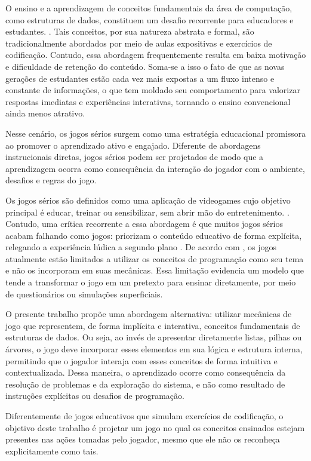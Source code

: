 O ensino e a aprendizagem de conceitos fundamentais da área de computação, como estruturas de dados, constituem um desafio recorrente para educadores e estudantes. . Tais conceitos, por sua natureza abstrata e formal, são tradicionalmente abordados por meio de aulas expositivas e exercícios de codificação. Contudo, essa abordagem frequentemente resulta em baixa motivação e dificuldade de retenção do conteúdo. Soma-se a isso o fato de que as novas gerações de estudantes estão cada vez mais expostas a um fluxo intenso e constante de informações, o que tem moldado seu comportamento para valorizar respostas imediatas e experiências interativas, tornando o ensino convencional ainda menos atrativo.

Nesse cenário, os jogos sérios surgem como uma estratégia educacional promissora ao promover o aprendizado ativo e engajado. Diferente de abordagens instrucionais diretas, jogos sérios podem ser projetados de modo que a aprendizagem ocorra como consequência da interação do jogador com o ambiente, desafios e regras do jogo. 

Os jogos sérios são definidos como uma aplicação de videogames cujo objetivo principal é educar, treinar ou sensibilizar, sem abrir mão do entretenimento. \cite{mouaheb2012serious}. Contudo, uma crítica recorrente a essa abordagem é que muitos jogos sérios acabam falhando como jogos: priorizam o conteúdo educativo de forma explícita, relegando a experiência lúdica a segundo plano . De acordo com \cite{de2025codebo}, os jogos atualmente estão limitados a utilizar os conceitos de programação como seu tema e não os incorporam em suas mecânicas. Essa limitação evidencia um modelo que tende a transformar o jogo em um pretexto para ensinar diretamente, por meio de questionários ou simulações superficiais.

O presente trabalho propõe uma abordagem alternativa: utilizar mecânicas de jogo que representem, de forma implícita e interativa, conceitos fundamentais de estruturas de dados. Ou seja, ao invés de apresentar diretamente listas, pilhas ou árvores, o jogo deve incorporar esses elementos em sua lógica e estrutura interna, permitindo que o jogador interaja com esses conceitos de forma intuitiva e contextualizada. Dessa maneira, o aprendizado ocorre como consequência da resolução de problemas e da exploração do sistema, e não como resultado de instruções explícitas ou desafios de programação.

Diferentemente de jogos educativos que simulam exercícios de codificação, o objetivo deste trabalho é projetar um jogo no qual os conceitos ensinados estejam presentes nas ações tomadas pelo jogador, mesmo que ele não os reconheça explicitamente como tais.

